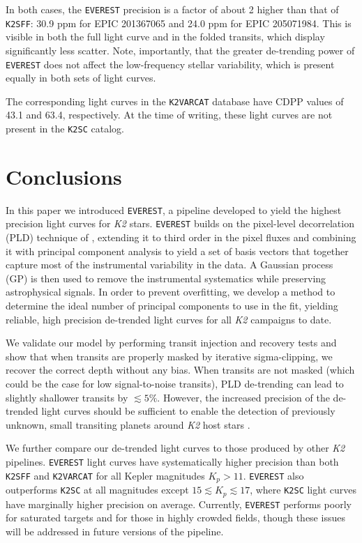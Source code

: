 \documentclass[]{emulateapj}
\begin{document}
In both cases, the \texttt{EVEREST} precision is a factor of about 2 higher than that of
\texttt{K2SFF}: 30.9 ppm for EPIC 201367065 and 24.0 ppm for EPIC 205071984. This is visible 
in both the full light curve and in the folded transits,
which display significantly less scatter. Note, importantly, that the greater de-trending
power of \texttt{EVEREST} does not affect the low-frequency stellar variability, which is 
present equally in both sets of light curves.

The corresponding light curves in the \texttt{K2VARCAT} database have CDPP values of 43.1
and 63.4, respectively. At the time of writing, these light curves are not present in the
\texttt{K2SC} catalog.

\section{Conclusions}
\label{sec:conclusions}
In this paper we introduced \texttt{EVEREST}, a pipeline developed to yield the highest
precision light curves for \emph{K2} stars. \texttt{EVEREST} builds on the pixel-level
decorrelation (PLD) technique of \cite{DEM15}, extending it to third order in the pixel
fluxes and combining it with principal component analysis to yield a set of basis
vectors that together capture most of the instrumental variability in the data. A Gaussian
process (GP) is then used to remove the instrumental
systematics while preserving astrophysical signals. In order to prevent overfitting, we
develop a method to determine the ideal number of principal components to use in the fit, yielding reliable,
high precision de-trended light curves for all \emph{K2} campaigns to date.

We validate our model by performing transit injection and recovery tests and show that
when transits are properly masked by iterative sigma-clipping, we recover the correct depth without any bias.
When transits are not masked (which could be the case for low signal-to-noise transits), PLD de-trending
can lead to slightly shallower transits by $\lesssim 5\%$. However, the increased
precision of the de-trended light curves should be sufficient to enable the
detection of previously unknown, small transiting planets around \emph{K2} host stars \citep{KRU16}.

We further compare our de-trended light curves to those produced by other \emph{K2} pipelines.
\texttt{EVEREST} light curves have systematically higher precision than both \texttt{K2SFF}
and \texttt{K2VARCAT} for all Kepler magnitudes $K_p > 11$. \texttt{EVEREST} also outperforms
\texttt{K2SC} at all magnitudes except $15 \lesssim K_p \lesssim 17$, where \texttt{K2SC}
light curves have marginally higher precision on average. Currently, \texttt{EVEREST}
performs poorly for saturated targets and for those in highly crowded fields, though
these issues will be addressed in future versions of the pipeline.
\end{document}
